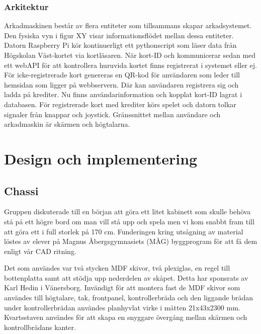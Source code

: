 \documentclass[12pt,fleqn,openany]{book} %
\begin{document}
\subsection{Arkitektur}
Arkadmaskinen består av flera entiteter som tillsammans skapar arkadsystemet. Den fysiska vyn i figur XY visar informationsflödet 
mellan dessa entiteter. Datorn Raspberry Pi kör kontinuerligt ett pythonscript som läser data från Högskolan Väst-kortet via kortläsaren. 
När kort-ID och kommunicerar sedan med ett webAPI för att kontrollera huruvida kortet finns registrerat i systemet eller ej. För 
icke-registrerade kort genereras en QR-kod för användaren som leder till hemsidan som ligger på webbservern. Där kan användaren 
registrera sig och ladda på krediter. Nu finns användarinformation och kopplat kort-ID lagrat i databasen. För registrerade kort med 
krediter körs spelet och datorn tolkar signaler från knappar och joystick. Gränssnittet mellan användare och arkadmaskin är skärmen 
och högtalarna.


\chapter{Design och implementering}
\section{Chassi}
Gruppen diskuterade till en början att göra ett litet kabinett som skulle behöva stå på ett högre bord om man vill stå upp 
och spela men vi kom snabbt fram till att göra ett i full storlek på 170 cm. Funderingen kring utsågning av material löstes av 
elever på Magnus Åbergsgymnasiets (MÅG) byggprogram för att få dem enligt vår CAD ritning.

\bigskip
Det som användes var två stycken MDF skivor, två plexiglas, en regel till bottenplatta samt att stödja upp nederdelen av skåpet. 
Detta har sponsrats av Karl Hedin i Vänersborg. Invändigt för att montera fast de MDF skivor som användes till högtalare, tak, 
frontpanel, kontrollerbräda och den liggande brädan under kontrollerbrädan användes planhyvlat virke i måtten 21x43x2300 mm. 
Kvartsstaven användes för att skapa en snyggare övergång mellan skärmen och kontrollbrädans kanter.
\end{document}
